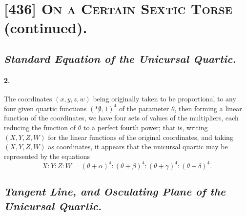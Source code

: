 \documentclass[11pt,a4paper]{article}
\begin{document}
\section{[436] \textsc{On a Certain Sextic Torse} (continued).}

\setcounter{section}{1}

\subsection*{\textit{Standard Equation of the Unicursal Quartic.}}

\paragraph{2.}
The coordinates $(x, y, z, w)$ being originally taken to be proportional to any
four given quartic functions $(*\!\not\theta, 1)^4$ of the parameter $\theta$, then
forming a linear function of the coordinates, we have four sets of values of the
multipliers, each reducing the function of $\theta$ to a perfect fourth power; that
is, writing $(X, Y, Z, W)$ for the linear functions of the original coordinates,
and taking $(X, Y, Z, W)$ as coordinates, it appears that the unicursal quartic may
be represented by the equations
\[
X : Y : Z : W = (\theta + \alpha)^4 : (\theta + \beta)^4 :
   (\theta + \gamma)^4 : (\theta + \delta)^4.
\]

\subsection*{\textit{Tangent Line, and Osculating Plane of the Unicursal Quartic.}}
\end{document}
